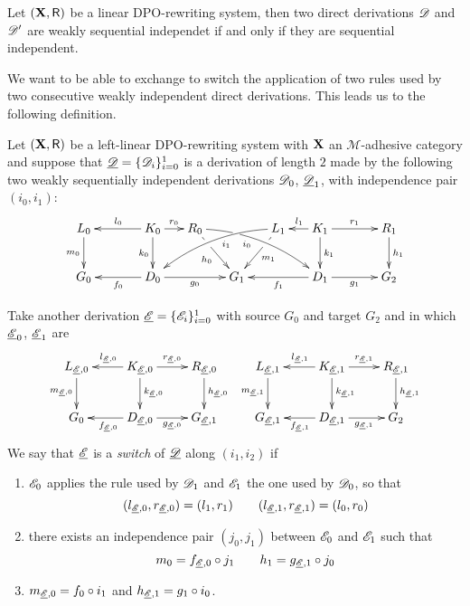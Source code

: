 	\begin{proposition}\label{rem:weak}
	Let $(\textbf {\textup{X}}, \mathsf{R})$ be a linear DPO-rewriting system, then two direct derivations $\mathscr{D}$ and $\mathscr{D}'$ are weakly sequential independet if and only if they are sequential independent. 
\end{proposition}


We want to be able to exchange to switch the application of two rules used by two consecutive weakly independent direct derivations. This leads us to the following definition.

\begin{definition}[Switch]
  \label{de:switch}
 Let $(\textbf {\textup{X}}, \mathsf{R})$ be a left-linear DPO-rewriting system with $\textbf {\textup{X}}$ an $\mathcal{M}$-adhesive category and suppose that $\underline{\mathscr{D}}=\{\mathscr{D}_i\}_{i=0}^1$  is a derivation of length $2$ made by the following two weakly sequentially independent derivations $\mathscr{D}_0$, $\underline{\mathscr{D}}_1$, with independence pair $(i_0, i_1)$:
 	\[\xymatrix@C=15pt{L_0 \ar[d]_{m_0}&& K_0 \ar[d]_{k_0}\ar[ll]_{l_0} \ar[r]^{r_0} & R_0 \ar@/^.35cm/[drrr]|(.3)\hole_(.4){i_0} \ar[dr]|(.3)\hole_{h_0} && L_1 \ar@/_.35cm/[dlll]^(.4){i_1} \ar[dl]|(.3)\hole^{m_1}& K_1 \ar[d]^{k_1}\ar[l]_{l_1} \ar[rr]^{r_1} && R_1 \ar[d]^{h_1}\\G_0 && \ar[ll]^{f_0} D_0 \ar[rr]_{g_0}&& G_1  && \ar[ll]^{f_1} D_1 \ar[rr]_{g_1}&& G_2}\]
 	
 	Take another derivation $\underline{\mathscr{E}}=\{\mathscr{E}_i\}_{i=0}^1$ with source $G_0$ and target $G_2$ and in which $\underline{\mathscr{E}}_0$, $\underline{\mathscr{E}}_1$ are
\[\xymatrix{L_{\der{E},0} \ar[d]_{m_{\der{E},0}}& K_{\der{E},0} \ar[d]^{k_{\der{E},0}}\ar[l]_{l_{\der{E},0}} \ar[r]^{r_{\der{E},0}} & R_{\der{E},0} \ar[d]^{h_{\der{E},0}} & L_{\der{E},1} \ar[d]_{m_{\der{E},1}}& K_{\der{E},1} \ar[d]^{k_{\der{E},1}}\ar[l]_{l_{\der{E},1}} \ar[r]^{r_{\der{E},1}} & R_{\der{E},1} \ar[d]^{h_{\der{E},1}}\\G_{0} & \ar[l]^{f_{\der{E},0}} D_{\der{E},0} \ar[r]_{g_{\der{E},0}}& G_{\der{E},1} & G_{\der{E},1} & \ar[l]^{f_{\der{E},1}} D_{\der{E},1} \ar[r]_{g_{\der{E},1}}& G_{2}}\]
 	We say that $\underline{\mathscr{E}}$ is a
 	 	 \emph{switch} of $\underline{\mathscr{D}}$ along $(i_1, i_2)$ if
 	\begin{enumerate}
 		\item $\mathscr{E}_0$ applies the rule used by $\mathscr{D}_1$ and $\mathscr{E}_1$ the one used by $\mathscr{D}_0$, so that
 		\[(l_{\underline{\mathscr{E}},0}, r_{\underline{\mathscr{E}},0})=(l_1,r_1)  \qquad (l_{\underline{\mathscr{E}},1}, r_{\underline{\mathscr{E}},1})=(l_0,r_0)\]
 		\item there exists an independence pair $(j_0, j_1)$ between $\mathscr{E}_0$ and $\mathscr{E}_1$ such that
 		\[ m_0=f_{\underline{\mathscr{E}},0} \circ j_1 \qquad h_1=g_{\underline{\mathscr{E}},1} \circ j_0\]
 		\item $m_{\underline{\mathscr{E}},0}= f_0\circ i_1$ and $h_{\underline{\mathscr{E}},1}= g_{1}\circ i_0$.
 	\end{enumerate}
\end{definition}

